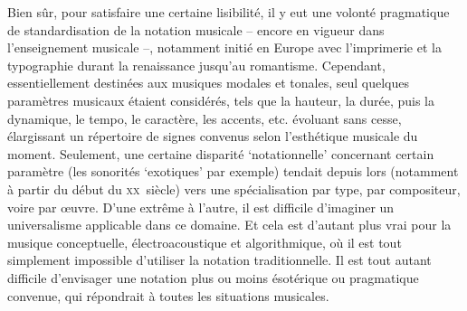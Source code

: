 \documentclass{article}
\begin{document}
Bien sûr, pour satisfaire une certaine lisibilité, il y eut une volonté pragmatique de standardisation de la notation musicale -- encore en vigueur dans l'enseignement musicale --, notamment initié en Europe avec l'imprimerie et la typographie durant la renaissance jusqu'au romantisme. Cependant, essentiellement destinées aux musiques modales et tonales, seul quelques paramètres musicaux étaient considérés, tels que la hauteur, la durée, puis la dynamique, le tempo, le caractère, les accents, etc. évoluant sans cesse, élargissant un répertoire de signes convenus selon l'esthétique musicale du moment.  
Seulement, une certaine disparité `notationnelle' concernant certain paramètre (les sonorités `exotiques' par exemple) tendait depuis lors (notamment à partir du début du  \textsc{xx}\ieme ~siècle) vers une  spécialisation par type, par compositeur, voire par œuvre.
D'une extrême à l'autre, il est difficile d'imaginer un universalisme applicable dans ce domaine. Et cela est d'autant plus vrai pour la musique conceptuelle, électroacoustique et algorithmique, où il est tout simplement impossible d'utiliser la notation traditionnelle. Il est tout autant difficile d'envisager une notation plus ou moins ésotérique ou pragmatique convenue, qui répondrait à toutes les situations musicales.%

\end{document}
